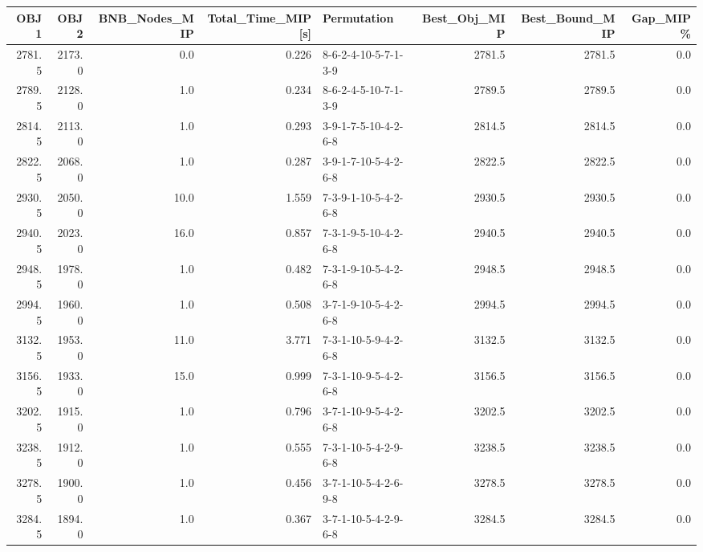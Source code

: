 \begin{tabular}{rrrrlrrr}
\toprule
   OBJ1 &    OBJ2 &  BNB\_Nodes\_MIP &  Total\_Time\_MIP[s] &           Permutation &  Best\_Obj\_MIP &  Best\_Bound\_MIP &  Gap\_MIP\% \\
\midrule
 2781.5 &  2173.0 &            0.0 &              0.226 &  8-6-2-4-10-5-7-1-3-9 &        2781.5 &          2781.5 &       0.0 \\
 2789.5 &  2128.0 &            1.0 &              0.234 &  8-6-2-4-5-10-7-1-3-9 &        2789.5 &          2789.5 &       0.0 \\
 2814.5 &  2113.0 &            1.0 &              0.293 &  3-9-1-7-5-10-4-2-6-8 &        2814.5 &          2814.5 &       0.0 \\
 2822.5 &  2068.0 &            1.0 &              0.287 &  3-9-1-7-10-5-4-2-6-8 &        2822.5 &          2822.5 &       0.0 \\
 2930.5 &  2050.0 &           10.0 &              1.559 &  7-3-9-1-10-5-4-2-6-8 &        2930.5 &          2930.5 &       0.0 \\
 2940.5 &  2023.0 &           16.0 &              0.857 &  7-3-1-9-5-10-4-2-6-8 &        2940.5 &          2940.5 &       0.0 \\
 2948.5 &  1978.0 &            1.0 &              0.482 &  7-3-1-9-10-5-4-2-6-8 &        2948.5 &          2948.5 &       0.0 \\
 2994.5 &  1960.0 &            1.0 &              0.508 &  3-7-1-9-10-5-4-2-6-8 &        2994.5 &          2994.5 &       0.0 \\
 3132.5 &  1953.0 &           11.0 &              3.771 &  7-3-1-10-5-9-4-2-6-8 &        3132.5 &          3132.5 &       0.0 \\
 3156.5 &  1933.0 &           15.0 &              0.999 &  7-3-1-10-9-5-4-2-6-8 &        3156.5 &          3156.5 &       0.0 \\
 3202.5 &  1915.0 &            1.0 &              0.796 &  3-7-1-10-9-5-4-2-6-8 &        3202.5 &          3202.5 &       0.0 \\
 3238.5 &  1912.0 &            1.0 &              0.555 &  7-3-1-10-5-4-2-9-6-8 &        3238.5 &          3238.5 &       0.0 \\
 3278.5 &  1900.0 &            1.0 &              0.456 &  3-7-1-10-5-4-2-6-9-8 &        3278.5 &          3278.5 &       0.0 \\
 3284.5 &  1894.0 &            1.0 &              0.367 &  3-7-1-10-5-4-2-9-6-8 &        3284.5 &          3284.5 &       0.0 \\

\end{tabular}
